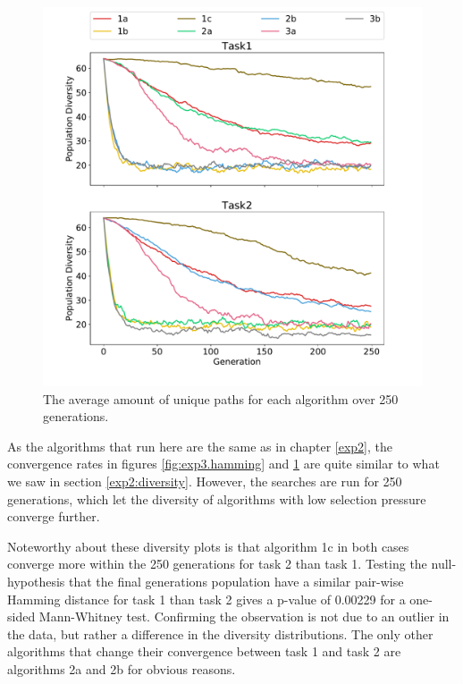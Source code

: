 \begin{figure}[!ht]
    \includegraphics[width=\textwidth, center]{Chapters/4.Experiments/exp3/figures/diversity_frequency.pdf}
    \caption[Frequency diversity plot]{The average amount of unique paths for each algorithm over 250 generations.}
    \label{fig:exp3.frequency}
\end{figure}

As the algorithms that run here are the same as in chapter \ref{exp2}, the convergence rates in figures \ref{fig:exp3.hamming} and \ref{fig:exp3.frequency} are quite similar to what we saw in section \ref{exp2:diversity}. However, the searches are run for 250 generations, which let the diversity of algorithms with low selection pressure converge further.

Noteworthy about these diversity plots is that algorithm 1c in both cases converge more within the 250 generations for task 2 than task 1. Testing the null-hypothesis that the final generations population have a similar pair-wise Hamming distance for task 1 than task 2 gives a p-value of 0.00229 for a one-sided Mann-Whitney test. Confirming the observation is not due to an outlier in the data, but rather a difference in the diversity distributions. The only other algorithms that change their convergence between task 1 and task 2 are algorithms 2a and 2b for obvious reasons.  

